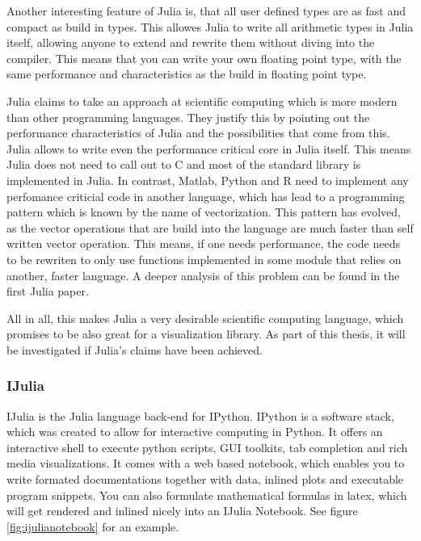 Another interesting feature of Julia is, that all user defined types are as fast and compact as build in types.
This allowes Julia to write all arithmetic types in Julia itself, allowing anyone to extend and rewrite them without diving into the compiler. This means that you can write your own floating point type, with the same performance and characteristics as the build in floating point type.

Julia claims to take an approach at scientific computing which is more modern than other programming languages.
They justify this by pointing out the performance characteristics of Julia and the possibilities that come from this. 
Julia allows to write even the performance critical core in Julia itself. This means Julia does not need to call out to C and most of the standard library is implemented in Julia. 
In contrast, Matlab, Python and R need to implement any perfomance criticial code in another language, which has lead to a programming pattern which is known by the name of vectorization. This pattern has evolved, as the vector operations that are build into the language are much faster than self written vector operation.
This means, if one needs performance, the code needs to be rewriten to only use functions implemented in some module that relies on another, faster language.
A deeper analysis of this problem can be found in the first Julia paper\cite{2012arXiv1209.5145B}.

All in all, this makes Julia a very desirable scientific computing language, which promises to be also great for a visualization library.
As part of this thesis, it will be investigated if Julia's claims have been achieved.



\subsubsection{IJulia}
IJulia is the Julia language back-end for IPython.
IPython is a software stack, which was created to allow for interactive computing in Python.
It offers an interactive shell to execute python scripts, \ac{GUI} toolkits, tab completion and rich media visualizations.
It comes with a web based notebook, which enables you to write formated documentations together with data, inlined plots and executable program snippets. You can also formulate mathematical formulas in latex, which will get rendered and inlined nicely into an IJulia Notebook.
See figure \ref{fig:ijulianotebook} for an example.

